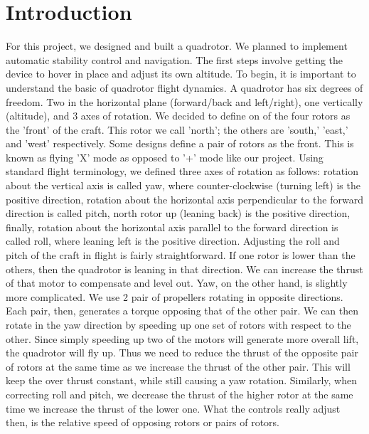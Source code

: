 \section{Introduction}

For this project, we designed and built a quadrotor.  We planned to implement automatic stability control and navigation.  The first steps involve getting the device to hover in place and adjust its own altitude.
	To begin, it is important to understand the basic of quadrotor flight dynamics.  A quadrotor has six degrees of freedom.  Two in the horizontal plane (forward/back and left/right), one vertically (altitude), and 3 axes of rotation.  We decided to define on of the four rotors as the 'front' of the craft.  This rotor we call 'north'; the others are 'south,' 'east,' and 'west' respectively.  Some designs define a pair of rotors as the front.  This is known as flying 'X' mode as opposed to '+' mode like our project.  Using standard flight terminology, we defined three axes of rotation as follows: rotation about the vertical axis is called yaw, where counter-clockwise (turning left) is the positive direction, rotation about the horizontal axis perpendicular to the forward direction is called pitch, north rotor up (leaning back) is the positive direction, finally, rotation about the horizontal axis parallel to the forward direction is called roll, where leaning left is the positive direction.
	Adjusting the roll and pitch of the craft in flight is fairly straightforward.  If one rotor is lower than the others, then the quadrotor is leaning in that direction.  We can increase the thrust of that motor to compensate and level out.  Yaw, on the other hand, is slightly more complicated.  We use 2 pair of propellers rotating in opposite directions.  Each pair, then, generates a torque opposing that of the other pair.  We can then rotate in the yaw direction by speeding up one set of rotors with respect to the other.  Since simply speeding up two of the motors will generate more overall lift, the quadrotor will fly up.  Thus we need to reduce the thrust of the opposite pair of rotors at the same time as we increase the thrust of the other pair.  This will keep the over thrust constant, while still causing a yaw rotation.  Similarly, when correcting roll and pitch, we decrease the thrust of the higher rotor at the same time we increase the thrust of the lower one.  What the controls really adjust then, is the relative speed of opposing rotors or pairs of rotors.
